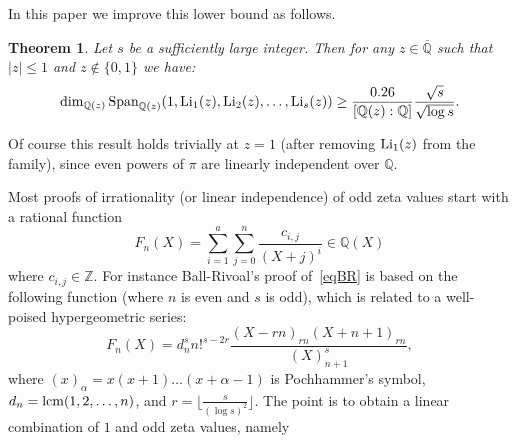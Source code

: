 \documentclass[12pt]{article}
\numberwithin{equation}{section}
\newtheorem{Th}{Theorem}
\newcommand{\Z}{\mathbb{Z}}
\newcommand{\Q}{\mathbb{Q}}
\newcommand{\Qbar}{\overline{\mathbb{Q}}}
\newcommand{\Span}{{\rm Span}}
\newcommand{\cij}{c_{i,j}}
\newcommand{\lcm}{{\rm lcm}}
\newcommand{\Li}{{\rm Li}}
\begin{document}
In this paper we improve this lower bound as follows. 


\begin{Th} \label{thpolylogs} Let $s $ be a sufficiently large integer. 
Then for any $z\in\Qbar$ such that $|z|\leq1$ and $z\not\in\{0,1\}$ we have:
$$\dim_{\Q(z)} \Span_{\Q(z)} (1,\Li_1(z),\Li_2(z),\ldots,\Li_s(z))\geq \frac{0.26}{[\Q(z):\Q]} \frac{\sqrt{s}}{\sqrt{ \log s}} .$$
\end{Th}

Of course this result holds trivially at $z=1$ (after removing $\Li_1(z)$ from the family), since even powers of $\pi$ are linearly independent over $\Q$.

\bigskip

Most proofs of irrationality (or linear independence) of odd zeta values start with a rational function 
$$
F_n(X) = \sum_{i=1}^a \sum_{j=0}^n \frac{\cij}{(X+j)^i} \in\Q(X)
$$
where $\cij\in\Z$. For instance Ball-Rivoal's proof of~\eqref{eqBR} is based on the following function
(where $n$ is even and $s$ is odd), which is related to a well-poised hypergeometric series:
$$
F_n(X) = d_n^s n!^{s-2r} \frac{ (X-rn)_{rn} (X+n+1)_{rn}}{(X)_{n+1}^s},
$$
where $(x)_\alpha = x(x+1)\ldots (x+\alpha-1)$ is Pochhammer's symbol, $d_n = \lcm(1,2,\ldots, n)$, and $r = \lfloor \frac{s}{(\log s)^2}\rfloor$. The point is to obtain a linear combination of $1$ and odd zeta values, namely 
\end{document}
